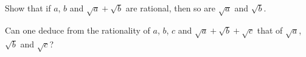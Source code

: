 Show that if $a$, $b$ and $\sqrt{a} + \sqrt{b}$ are rational, then so are $\sqrt{a}$ and $\sqrt{b}$.

Can one deduce from the rationality of $a$, $b$, $c$ and $\sqrt{a} + \sqrt{b} + \sqrt{c}$ that of $\sqrt{a}$, $\sqrt{b}$ and $\sqrt{c}$?
